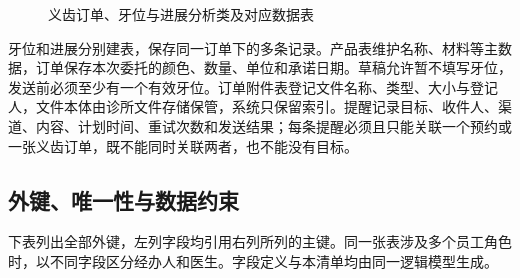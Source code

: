 \begin{figure}[H]\centering
{}
\caption{义齿订单、牙位与进展分析类及对应数据表}\label{fig:erd-order}
\end{figure}

牙位和进展分别建表，保存同一订单下的多条记录。产品表维护名称、材料等主数据，订单保存本次委托的颜色、数量、单位和承诺日期。草稿允许暂不填写牙位，发送前必须至少有一个有效牙位。订单附件表登记文件名称、类型、大小与登记人，文件本体由诊所文件存储保管，系统只保留索引。提醒记录目标、收件人、渠道、内容、计划时间、重试次数和发送结果；每条提醒必须且只能关联一个预约或一张义齿订单，既不能同时关联两者，也不能没有目标。

\clearpage
\subsection{外键、唯一性与数据约束}
下表列出全部外键，左列字段均引用右列所列的主键。同一张表涉及多个员工角色时，以不同字段区分经办人和医生。字段定义与本清单均由同一逻辑模型生成。



